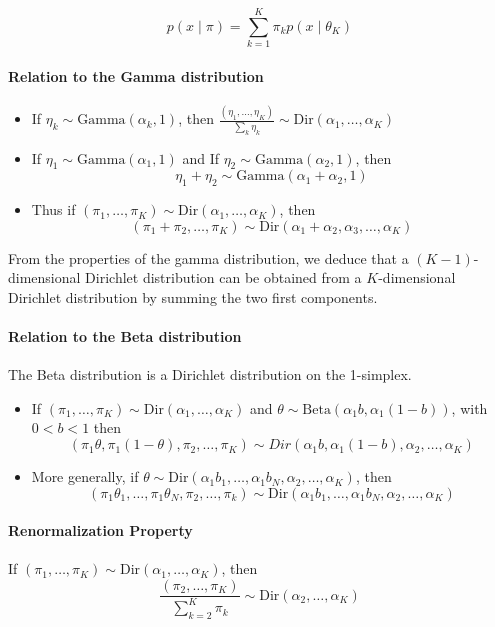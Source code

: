 \documentclass[twoside]{article}
\newcommand{\Dir}{\mathrm{Dir}}
\newcommand{\Gam}{\mathrm{Gamma}}
\newcommand{\Bet}{\mathrm{Beta}}
\begin{document}
$$ p(x \mid \pi) = \sum_{k=1}^K \pi_k p(x \mid \theta_K) $$

\paragraph{Relation to the Gamma distribution}

\begin{itemize}
\item If $\eta_k \sim \Gam(\alpha_k, 1)$, then $\frac{(\eta_1,\ldots,\eta_K)}{\sum_k \eta_k} \sim \Dir(\alpha_1,\ldots,\alpha_K)$
\item If $\eta_1 \sim \Gam(\alpha_1, 1)$ and If $\eta_2 \sim \Gam(\alpha_2, 1)$, then
\[ \eta_1 +\eta_2 \sim \Gam(\alpha_1 + \alpha_2, 1) \]
\item Thus if $(\pi_1,\ldots,\pi_K) \sim \Dir(\alpha_1,\ldots,\alpha_K)$, then
\[ (\pi_1 + \pi_2,\ldots,\pi_K) \sim \Dir(\alpha_1 + \alpha_2, \alpha_3,\ldots,\alpha_K) \]
\end{itemize}

From the properties of the gamma distribution, we deduce that a $(K-1)$-dimensional Dirichlet distribution can be obtained from a $K$-dimensional Dirichlet distribution by summing the two first components.

\paragraph{Relation to the Beta distribution}
The Beta distribution is a Dirichlet distribution on the 1-simplex.
\begin{itemize}
\item If $(\pi_1,\ldots,\pi_K) \sim \Dir(\alpha_1,\ldots,\alpha_K)$ and $\theta \sim \Bet{(\alpha_1b,\alpha_1(1-b))}$, with $0 < b < 1$ then
\[ (\pi_1\theta,\pi_1(1-\theta),\pi_2,\ldots,\pi_K) \sim Dir{(\alpha_1 b,\alpha_1(1-b),\alpha_2,\ldots,\alpha_K)} \]
\item More generally, if $\theta \sim \Dir{(\alpha_1b_1,\ldots,\alpha_1b_N,\alpha_2,\ldots,\alpha_K)}$, then
\[ (\pi_1\theta_1,\ldots,\pi_1\theta_N,\pi_2,\ldots,\pi_k) \sim \Dir{(\alpha_1b_1,\ldots,\alpha_1b_N,\alpha_2,\ldots,\alpha_K)} \]
\end{itemize}


\paragraph{Renormalization Property}

If $(\pi_1,\ldots,\pi_K) \sim \Dir(\alpha_1,\ldots,\alpha_K)$, then
\[
\frac{(\pi_2,\ldots,\pi_K)}{\sum_{k=2}^K \pi_k} \sim \Dir(\alpha_2,\ldots,\alpha_K)
\]
\end{document}
